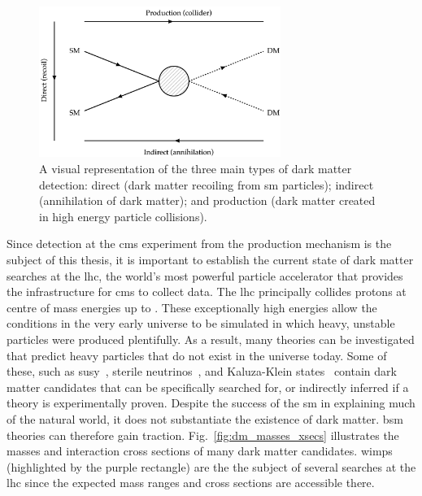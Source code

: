 \begin{figure}[htbp]
    \centering
    \includegraphics[width=0.7\textwidth]{figures/DM_detection_methods.png}
    \caption[A visual representation of the three main types of dark matter detection: direct, indirect, and production]{A visual representation of the three main types of dark matter detection: direct (dark matter recoiling from \acrlong{sm} particles); indirect (annihilation of dark matter); and production (dark matter created in high energy particle collisions).}
    \label{fig:dm_detection_methods}
\end{figure}

Since detection at the \acrshort{cms} experiment from the production mechanism is the subject of this thesis, it is important to establish the current state of dark matter searches at the \acrshort{lhc}, the world's most powerful particle accelerator that provides the infrastructure for \acrshort{cms} to collect data. The \acrshort{lhc} principally collides protons at centre of mass energies up to \comruntwo. These exceptionally high energies allow the conditions in the very early universe to be simulated in which heavy, unstable particles were produced plentifully. As a result, many theories can be investigated that predict heavy particles that do not exist in the universe today. Some of these, such as \acrshort{susy}~\cite{Martin:1997ns}, sterile neutrinos~\cite{doi:10.1142/S0218301313300191}, and Kaluza-Klein states~\cite{Han:1998sg} contain dark matter candidates that can be specifically searched for, or indirectly inferred if a theory is experimentally proven. Despite the success of the \acrlong{sm} in explaining much of the natural world, it does not substantiate the existence of dark matter. \acrshort{bsm} theories can therefore gain traction. Fig.~\ref{fig:dm_masses_xsecs} illustrates the masses and interaction cross sections of many dark matter candidates. \acrshort{wimp}s (highlighted by the purple rectangle) are the the subject of several searches at the \acrshort{lhc} since the expected mass ranges and cross sections are accessible there.

